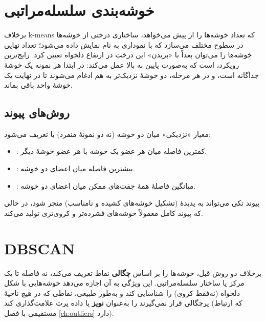 \section{خوشه‌بندی سلسله‌مراتبی}

برخلاف k-means که تعداد خوشه‌ها را از پیش می‌خواهد،
ساختاری درختی از خوشه‌ها در سطوح مختلف می‌سازد که با نموداری به نام
 نمایش داده می‌شود؛ تعداد نهایی
خوشه‌ها را می‌توان بعداً با «بریدن» این درخت در ارتفاع دلخواه تعیین
کرد. رایج‌ترین رویکرد،
 است که به‌صورت
پایین به بالا عمل می‌کند: در ابتدا هر نمونه یک خوشهٔ جداگانه است، و در
هر مرحله، دو خوشهٔ نزدیک‌تر به هم ادغام می‌شوند تا در نهایت یک خوشهٔ
واحد باقی بماند.

\subsection{روش‌های پیوند}

معیار «نزدیکی» میان دو خوشه (نه دو نمونهٔ منفرد) با
 تعریف می‌شود:

\begin{itemize}
    \item {}: کمترین فاصله میان
          هر عضو یک خوشه با هر عضو خوشهٔ دیگر.
    \item {}: بیشترین فاصله
          میان اعضای دو خوشه.
    \item {}: میانگین
          فاصلهٔ همهٔ جفت‌های ممکن میان اعضای دو خوشه.
\end{itemize}

پیوند تکی می‌تواند به پدیدهٔ  (تشکیل
خوشه‌های کشیده و نامناسب) منجر شود، در حالی که پیوند کامل معمولاً خوشه‌های
فشرده‌تر و کروی‌تری تولید می‌کند.

\section{DBSCAN}
\label{sec:dbscan}

 برخلاف دو روش قبل، خوشه‌ها را بر اساس
\textbf{چگالی} نقاط تعریف می‌کند، نه فاصله تا یک مرکز یا ساختار
سلسله‌مراتبی. این ویژگی به آن اجازه می‌دهد خوشه‌هایی با شکل دلخواه
(نه‌فقط کروی) را شناسایی کند و به‌طور طبیعی، نقاطی که در هیچ ناحیهٔ
پرچگالی قرار نمی‌گیرند را به‌عنوان \textbf{نویز} یا داده پرت علامت‌گذاری
کند (که ارتباط مستقیمی با فصل \ref{ch:outliers} دارد).

